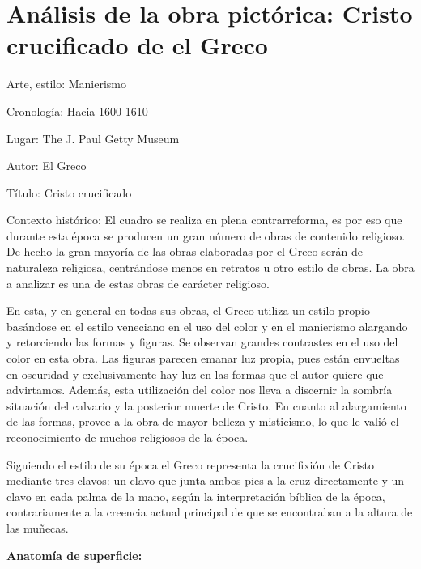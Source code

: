 \section{Análisis de la obra pictórica: Cristo crucificado de el Greco}

Arte, estilo: Manierismo

Cronología: Hacia 1600-1610

Lugar: The J. Paul Getty Museum

Autor: El Greco

Título: Cristo crucificado 


Contexto histórico: El cuadro se realiza en plena contrarreforma, es por eso que durante esta época se producen un gran número de obras de contenido religioso. De hecho la gran mayoría de las obras elaboradas por el Greco serán de naturaleza religiosa, centrándose menos en retratos u otro estilo de obras. La obra a analizar es una de estas obras de carácter religioso.

En esta, y en general en todas sus obras, el Greco utiliza un estilo propio basándose en el estilo veneciano en el uso del color y en el manierismo alargando y retorciendo las formas y figuras. Se observan grandes contrastes en el uso del color en esta obra. Las figuras parecen emanar luz propia, pues están envueltas en oscuridad y exclusivamente hay luz en las formas que el autor quiere que advirtamos. Además, esta utilización del color nos lleva a discernir la sombría situación del calvario y la posterior muerte de Cristo. En cuanto al alargamiento de las formas, provee a la obra de mayor belleza y misticismo, lo que le valió el reconocimiento de muchos religiosos de la época.

Siguiendo el estilo de su época el Greco representa la crucifixión de Cristo mediante tres clavos: un clavo que junta ambos pies a la cruz directamente y un clavo en cada palma de la mano, según la interpretación bíblica de la época, contrariamente a la creencia actual principal de que se encontraban a la altura de las muñecas.


\vspace{12pt}
\textbf{Anatomía de superficie:}

